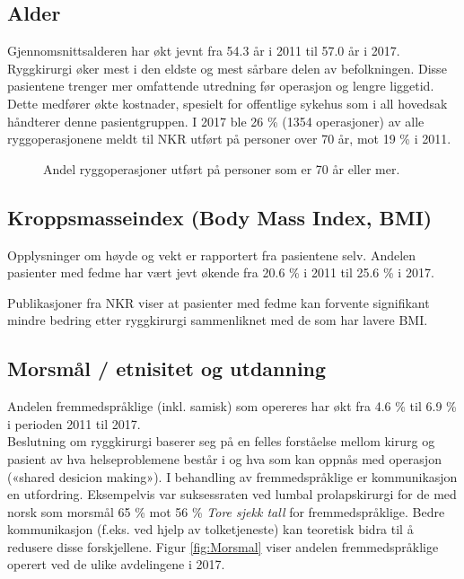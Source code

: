 \documentclass [norsk,a4paper,twoside]{article}\usepackage[]{graphicx}\usepackage[]{color}
\begin{document}
\subsection{Alder}




Gjennomsnittsalderen har økt jevnt fra 54.3 år 
i 2011 til 57.0 år i 2017. 
Ryggkirurgi øker mest i den eldste og mest sårbare delen av
befolkningen. Disse pasientene trenger mer omfattende utredning før operasjon og
lengre liggetid. Dette medfører økte kostnader, spesielt for offentlige sykehus som i
all hovedsak håndterer denne pasientgruppen. I 2017 ble 26 \% 
(1354 
operasjoner) av alle
ryggoperasjonene meldt til NKR utført på personer over 70 år, mot 19 \% 
i 2011. 

\begin{figure}[ht]
\caption{\label{fig:Alder70} Andel ryggoperasjoner utført på personer som er 70 år eller mer.}
\end{figure}





\subsection{Kroppsmasseindex (Body Mass Index, BMI)}



Opplysninger om høyde og vekt er rapportert fra pasientene selv.
Andelen pasienter med fedme har vært jevt økende fra 
20.6 \% 
i 2011
til 25.6 \%
i  2017.

Publikasjoner fra NKR viser at pasienter med fedme kan forvente signifikant mindre bedring etter 
ryggkirurgi sammenliknet med de som har lavere BMI. 




\subsection{Morsmål / etnisitet og utdanning}



Andelen fremmedspråklige (inkl. samisk) som opereres har økt fra 4.6 \% til 6.9 \% i perioden 2011 til 2017.\\
Beslutning om ryggkirurgi baserer seg på en felles forståelse mellom kirurg og
pasient av hva helseproblemene består i og hva som kan oppnås med operasjon
(«shared desicion making»). I behandling av fremmedspråklige er kommunikasjon
en utfordring. Eksempelvis var suksessraten ved lumbal prolapskirurgi for de med norsk som morsmål 65 \% mot 56 \% 
\textit{Tore sjekk tall} 
for fremmedspråklige. Bedre kommunikasjon (f.eks. ved hjelp av tolketjeneste) kan teoretisk bidra til å redusere disse
forskjellene. Figur \ref{fig:Morsmal} viser andelen fremmedspråklige operert ved de ulike avdelingene i 2017.
\end{document}
